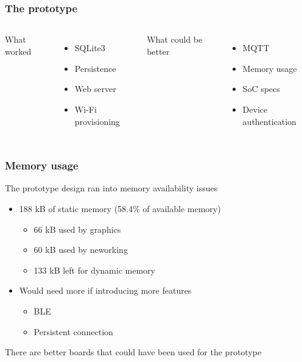 \documentclass{beamer}
\begin{document}
\frame{\titlepage}

\begin{frame}
  \frametitle{The prototype}

  \begin{columns}
    What worked
    \begin{itemize}
      \item SQLite3
      \item Persistence
      \item Web server
      \item Wi-Fi provisioning
    \end{itemize}

    What could be better
    \begin{itemize}
      \item MQTT
      \item Memory usage
      \item SoC specs
      \item Device authentication
    \end{itemize}
  \end{columns}


\end{frame}

\begin{frame}
  \frametitle{Memory usage}

  The prototype design ran into memory availability issues
  \begin{itemize}
    \item 188 kB of static memory (58.4\% of available memory)
    \begin{itemize}
      \item 66 kB used by graphics
      \item 60 kB used by neworking
      \item 133 kB left for dynamic memory
    \end{itemize}
    \item Would need more if introducing more features
    \begin{itemize}
      \item BLE
      \item Persistent connection
    \end{itemize}
  \end{itemize}
  There are better boards that could have been used for the prototype


\end{frame}
\end{document}
